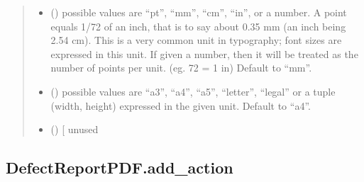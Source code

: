 \documentclass[letterpaper,10pt,english]{sphinxmanual}
\begin{document}
\begin{fulllineitems}
\begin{fulllineitems}
\begin{quote}
\begin{description}
\begin{itemize}
\item {} 
\sphinxAtStartPar
{} (\sphinxstyleliteralemphasis{\sphinxupquote{, }}\sphinxstyleliteralemphasis{\sphinxupquote{, }}) \textendash{} possible values are “pt”, “mm”, “cm”, “in”, or a number.
A point equals 1/72 of an inch, that is to say about 0.35 mm (an inch being 2.54 cm).
This is a very common unit in typography; font sizes are expressed in this unit.
If given a number, then it will be treated as the number of points per unit.  (eg. 72 = 1 in)
Default to “mm”.

\item {} 
\sphinxAtStartPar
{} () \textendash{} possible values are “a3”, “a4”, “a5”, “letter”, “legal” or a tuple
(width, height) expressed in the given unit. Default to “a4”.

\item {} 
\sphinxAtStartPar
{} () \textendash{} {[}\sphinxstylestrong{DEPRECATED}{]} unused

\end{itemize}

\end{description}\end{quote}

\end{fulllineitems}



\subsection{DefectReportPDF.add\_action}
\label{\detokenize{generated/quality_assessment.quality_pdf_report.DefectReportPDF.add_action:defectreportpdf-add-action}}\label{\detokenize{generated/quality_assessment.quality_pdf_report.DefectReportPDF.add_action::doc}}


\end{fulllineitems}
\end{document}

